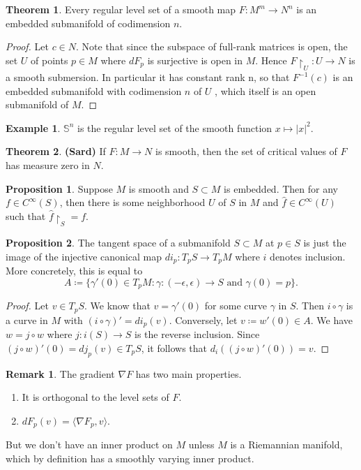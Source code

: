 \documentclass[10pt,letterpaper,cm]{nupset}
\theoremstyle{definition}
\newtheorem{exmp}{Example}
\newtheorem{remark}{Remark}
\newtheorem{theorem}{Theorem}
\newtheorem{prop}{Proposition}
\renewcommand{\S}{\mathbb S}
\newcommand{\1}{\mathbf{1}}
\newcommand{\0}{\vec 0}
\begin{document}
\begin{theorem}
Every regular level set of a smooth map $F: M^m \to N^n$ is an embedded submanifold of codimension $n$.
\end{theorem}
\begin{proof}
Let $c \in N$. Note that since the subspace of full-rank matrices is open, the set $U$ of points $p\in M$ where $dF_p$ is surjective is open in $M$. Hence $F\restriction_U : U \to N$ is a smooth submersion. In particular it has constant rank n, so that $F^{-1}(c)$ is an embedded submanifold with codimension $n$ of $U$ , which itself is an open submanifold of $M$.
\end{proof}

\begin{exmp}
$\S^n$ is the regular level set of the smooth function $x\mapsto |x|^2$.
\end{exmp}

\begin{theorem}{\textbf{(Sard)}}
If $F: M \to N$ is smooth, then the set of critical values of $F$ has measure zero in $N$.
\end{theorem}

\begin{prop}
Suppose $M$ is smooth and $S\subset M$ is embedded. Then for any $f \in C^{\infty}(S)$, then there is some neighborhood $U$ of $S$ in $M$ and $\hat{f} \in C^{\infty}(U)$ such that $\hat{f}\restriction_S = f$.
\end{prop}
\begin{prop}
The tangent space of a submanifold $S \subset M$ at $p\in S$ is just the image of the injective canonical map $di_p : T_pS \to T_p M$ where $i$ denotes inclusion. More concretely, this is equal to $$A\coloneqq \{ \gamma ' (0) \in T_pM : \gamma : (-\epsilon, \epsilon) \to S \text{ and } \gamma(0) =p\}.$$
\end{prop}
\begin{proof}
Let $v \in T_pS$. We know that $v= \gamma'(0)$ for some curve $\gamma$ in $S$. Then $i \circ \gamma$ is a curve in $M$ with $(i \circ \gamma)'= di_p(v)$. Conversely, let $v\coloneqq  w'(0) \in A$. We have $w = j \circ w$ where $j: i(S) \to S$ is the reverse inclusion. Since $(j \circ w)'(0) = dj_p(v) \in T_pS$, it follows that $d_i((j \circ w)'(0)) = v$.
\end{proof}


\begin{remark}
The gradient $\nabla F$ has two main properties.
\begin{enumerate}
\item It is orthogonal to the level sets of $F$.
\item $dF_p(v) = \langle \nabla F_p, v\rangle$.
\end{enumerate}
But we don't have an inner product on $M$ unless $M$ is a Riemannian manifold, which by definition has a smoothly varying inner product. 
\end{remark}
\end{document}
